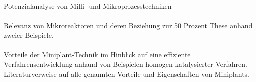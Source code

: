 \paragraph*{\cite{Hessel_2012}}Potenzialanalyse von Milli- und Mikroprozesstechniken

\paragraph*{\cite{Grundemann_2012}} Relevanz von Mikroreaktoren und deren Beziehung zur 50 Prozent These anhand zweier Beispiele.

\paragraph*{\cite{Behr_2012}} Vorteile der Miniplant-Technik im Hinblick auf eine effiziente Verfahrensentwicklung anhand von Beispielen homogen katalysierter Verfahren. Literaturverweise auf alle genannten Vorteile und Eigenschaften von Miniplants. \hfill \newline
